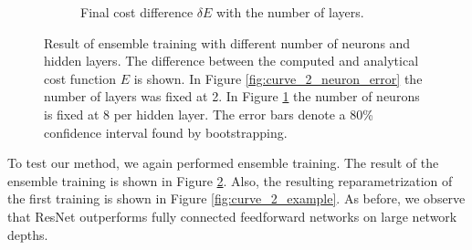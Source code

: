 \begin{figure}[b]
\begin{subfigure}[t]{0.5\textwidth}
        \caption{Final cost  difference \(\delta E\) with the number of layers.} \label{fig:curve_2_layer_error}
    \end{subfigure}
    \caption{Result of ensemble training with different number of neurons and hidden layers. The difference between the computed and analytical cost function \(E\) is shown. In Figure \ref{fig:curve_2_neuron_error} the number of layers was fixed at 2. In Figure \ref{fig:curve_2_layer_error} the number of neurons is fixed at 8 per hidden layer. The error bars denote a 80\% confidence interval found by bootstrapping.} \label{fig:curve_2_parmas_eks}
\end{figure}

To test our method, we again performed ensemble training. The result of the ensemble training is shown in Figure \ref{fig:curve_2_parmas_eks}. Also, the resulting reparametrization of the first training is shown in Figure \ref{fig:curve_2_example}. As before, we observe that ResNet outperforms fully connected feedforward networks on large network depths. 
